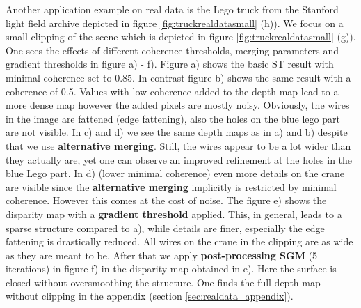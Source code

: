 \documentclass  [
  paper    = a4,
  BCOR     = 10mm,
  twoside,
  fontsize = 12pt,
  fleqn,
  toc      = bibnumbered,
  toc      = listofnumbered,
  numbers  = noendperiod,
  headings = normal,
  listof   = leveldown,
  version  = 3.03
]                                       {scrreprt}
\begin{document}
Another application example on real data is the Lego truck from the Stanford light field archive depicted in figure \ref{fig:truckrealdatasmall} (h)). We focus on a small clipping of the scene which is depicted in figure \ref{fig:truckrealdatasmall} (g)). One sees the effects of different coherence thresholds, merging parameters and gradient thresholds in figure a) - f). Figure a) shows the basic ST result with minimal coherence set to 0.85. In contrast figure b) shows the same result with a coherence of 0.5. Values with low coherence added to the depth map lead to a more dense map however the added pixels are mostly noisy. Obviously, the wires in the image are fattened (edge fattening), also the holes on the blue lego part are not visible. In c) and d) we see the same depth maps as in a) and b) despite that we use \textbf{alternative merging}. Still, the wires appear to be a lot wider than they actually are, yet one can observe an improved refinement at the holes in the blue Lego part. In d) (lower minimal coherence) even more details on the crane are visible since the \textbf{alternative merging} implicitly is restricted by minimal coherence. However this comes at the cost of noise. The figure e) shows the disparity map with a \textbf{gradient threshold} applied. This, in general, leads to a sparse structure compared to a), while details are finer, especially the edge fattening is drastically reduced. All wires on the crane in the clipping are as wide as they are meant to be. After that we apply \textbf{post-processing SGM} (5 iterations) in figure f) in the disparity map obtained in e). Here the surface is closed without oversmoothing the structure. One finds the full depth map without clipping in the appendix (section \ref{sec:realdata_appendix}).
\end{document}

